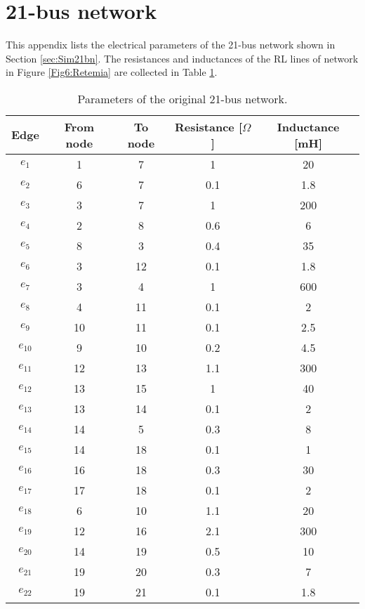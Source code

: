 \documentclass[a4paper]{article}
\theoremstyle{plain}
\begin{document}
     \section{21-bus network}
		\label{Appendix:label}
		This appendix lists the electrical parameters of the
                21-bus network shown in Section \ref{sec:Sim21bn}. 
		The resistances and inductances of the RL lines of network in Figure \ref{Fig6:Retemia} are collected in Table \ref{Appendix:Table21original}.
		\begin{table}[!h]
			\centering
			\begin{tabular}{ccccc}
				\toprule
				Edge & From node & To node & Resistance [$\Omega$] & Inductance [mH] \\
				\midrule
				$e_1$ & 1 & 7 & 1 & 20 \\
				$e_2$ & 6 & 7 & 0.1 & 1.8 \\
				$e_3$ & 3 & 7 & 1 & 200 \\
				$e_4$ & 2 & 8 & 0.6 & 6 \\
				$e_5$ & 8 & 3 & 0.4 & 35 \\
				$e_6$ & 3 & 12 & 0.1 & 1.8 \\
				$e_7$ & 3 & 4 & 1 & 600 \\
				$e_8$ & 4 & 11 & 0.1 & 2 \\
				$e_9$ & 10 & 11 & 0.1 & 2.5\\
				$e_{10}$ & 9 & 10 & 0.2 & 4.5 \\
				$e_{11}$ & 12 & 13 & 1.1 & 300 \\
				$e_{12}$ & 13 & 15 & 1 & 40 \\
				$e_{13}$ & 13 & 14 & 0.1 & 2 \\
				$e_{14}$ & 14 & 5 & 0.3 & 8 \\
				$e_{15}$ & 14 & 18 & 0.1 & 1 \\
				$e_{16}$ & 16 & 18 & 0.3 & 30 \\
				$e_{17}$ & 17 & 18 & 0.1 & 2 \\
				$e_{18}$ & 6 & 10 & 1.1 & 20 \\
				$e_{19}$ & 12 & 16 & 2.1 & 300 \\
				$e_{20}$ & 14 & 19 & 0.5 & 10 \\
				$e_{21}$ & 19 & 20 & 0.3 & 7 \\
				$e_{22}$ & 19 & 21 & 0.1 & 1.8  \\
				\bottomrule
			\end{tabular}
			\caption{Parameters of the original 21-bus network.}
			\label{Appendix:Table21original}
		\end{table}
\end{document}
